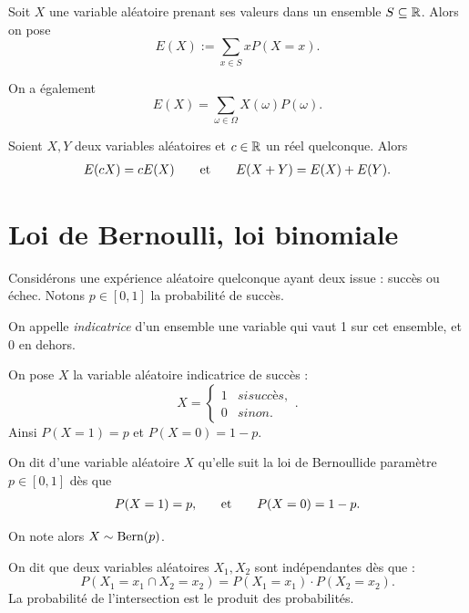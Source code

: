 \documentclass[a4paper, 12pt]{report}
\begin{document}
\begin{defn}[espérance]
	Soit $X$ une variable aléatoire prenant ses valeurs dans un ensemble $S \subseteq\mathbb{R}$.
	Alors on pose
		\[ E(X) := \sum_{x\in S} x P(X=x). \]
\end{defn}

\begin{rmq}
	On a également
		\[ E(X) = \sum_{\omega\in\Omega} X(\omega) P(\omega). \]
\end{rmq}

\begin{thm}
	Soient $X, Y$ deux variables aléatoires et $c\in\mathbb{R}$ un réel quelconque.
	Alors
		\begin{align*}
			E(cX) = c E(X) && \quad \text{et} \quad && E(X+Y) = E(X) + E(Y).
		\end{align*}
\end{thm}

\section{Loi de Bernoulli, loi binomiale}

Considérons une expérience aléatoire quelconque ayant deux issue : succès ou échec.
Notons $p\in[0,1]$ la probabilité de succès.

\begin{nomen}
	On appelle \emph{indicatrice} d'un ensemble une variable qui vaut 1 sur cet ensemble, et 0 en dehors.
\end{nomen}

On pose $X$ la variable aléatoire indicatrice de succès :
	\[ X = \begin{cases*} 1 & si succès, \\ 0 & sinon. \end{cases*}. \]
Ainsi $P(X=1) = p$ et $P(X=0) = 1-p$.

\begin{defn}
	On dit d'une variable aléatoire $X$ qu'elle suit la loi de Bernoulli\footnotemark de paramètre $p\in[0,1]$ dès que
		\begin{align*}
			P(X = 1) = p, && \quad \text{et} \quad && P(X=0) = 1-p.
		\end{align*}
\end{defn}

\begin{nota}
	On note alors $X \sim \text{Bern}(p)$.
\end{nota}

\begin{defn}[Indépendance]
	On dit que deux variables aléatoires $X_1, X_2$ sont indépendantes dès que :
		\[ P(X_1 = x_1 \cap X_2 = x_2) = P(X_1 = x_1) \cdot P(X_2 = x_2). \]
	La probabilité de l'intersection est le produit des probabilités.
\end{defn}
\end{document}
